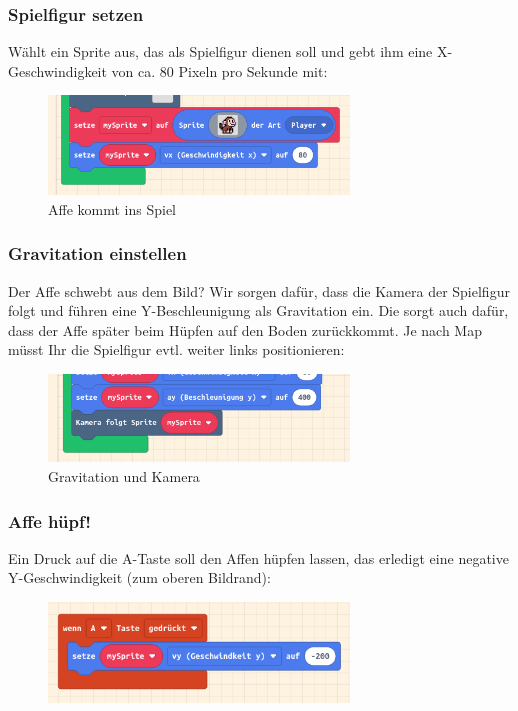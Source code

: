 \documentclass{beamer}
\begin{document}
\begin{frame}
 \frametitle{Spielfigur setzen}
 
 Wählt ein Sprite aus, das als Spielfigur dienen soll und gebt ihm eine X-Geschwindigkeit von ca. 80 Pixeln pro Sekunde mit:
 
\begin{figure}
  \includegraphics[width=8cm]{game27.png}
  \caption{Affe kommt ins Spiel}
  \label{fig:game27}
\end{figure}
\end{frame}

\begin{frame}
 \frametitle{Gravitation einstellen}
 
 Der Affe schwebt aus dem Bild? Wir sorgen dafür, dass die Kamera der Spielfigur folgt und führen eine Y-Beschleunigung als Gravitation ein. Die sorgt auch dafür, dass der Affe später beim Hüpfen auf den Boden zurückkommt. Je nach Map müsst Ihr die Spielfigur evtl. weiter links positionieren:
 
\begin{figure}
  \includegraphics[width=8cm]{game28.png}
  \caption{Gravitation und Kamera}
  \label{fig:game28}
\end{figure}
\end{frame}

\begin{frame}
 \frametitle{Affe hüpf!}
 
Ein Druck auf die A-Taste soll den Affen hüpfen lassen, das erledigt eine negative Y-Geschwindigkeit (zum oberen Bildrand):
 
\begin{figure}
  \includegraphics[width=8cm]{game29.png}
  \caption{}
  \label{fig:game29}
\end{figure}
\end{frame}
\end{document}
